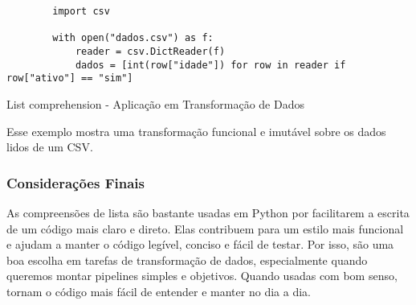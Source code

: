 \begin{listing}[!ht]
    \begin{verbatim}
        import csv

        with open("dados.csv") as f:
            reader = csv.DictReader(f)
            dados = [int(row["idade"]) for row in reader if row["ativo"] == "sim"]
    \end{verbatim}
    \caption{List comprehension - Aplicação em Transformação de Dados}
    \label{listing:2}
\end{listing}

Esse exemplo mostra uma transformação funcional e imutável sobre os dados lidos de um CSV.

\subsubsection{Considerações Finais}
As compreensões de lista são bastante usadas em Python por facilitarem a escrita de um código mais claro e direto. Elas contribuem para um estilo mais funcional e ajudam a manter o código legível, conciso e fácil de testar. Por isso, são uma boa escolha em tarefas de transformação de dados, especialmente quando queremos montar pipelines simples e objetivos. Quando usadas com bom senso, tornam o código mais fácil de entender e manter no dia a dia.